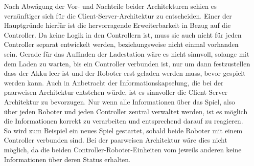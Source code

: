 Nach Abwägung der Vor- und Nachteile beider Architekturen schien es vernünftiger sich für die Client-Server-Architektur zu entscheiden. Einer der Hauptgründe hierfür ist die hervorragende Erweiterbarkeit in Bezug auf die Controller. Da keine Logik in den Controllern ist, muss sie auch nicht für jeden Controller separat entwickelt werden, beziehungsweise nicht einmal vorhanden sein. Gerade für das Auffinden der Ladestation wäre es nicht sinnvoll, solange mit dem Laden zu warten, bis ein Controller verbunden ist, nur um dann festzustellen dass der Akku leer ist und der Roboter erst geladen werden muss, bevor gespielt werden kann. Auch in Anbetracht der Informationskapselung, die bei der paarweisen Architektur entstehen würde, ist es sinnvoller die Client-Server-Architektur zu bevorzugen. Nur wenn alle Informationen über das Spiel, also über jeden Roboter und jeden Controller zentral verwaltet werden, ist es möglich die Informationen korrekt zu verarbeiten und entsprechend darauf zu reagieren. So wird zum Beispiel ein neues Spiel gestartet, sobald beide Roboter mit einem Controller verbunden sind. Bei der paarweisen Architektur wäre dies nicht möglich, da die beiden Controller-Roboter-Einheiten vom jeweils anderen keine Informationen über deren Status erhalten.
